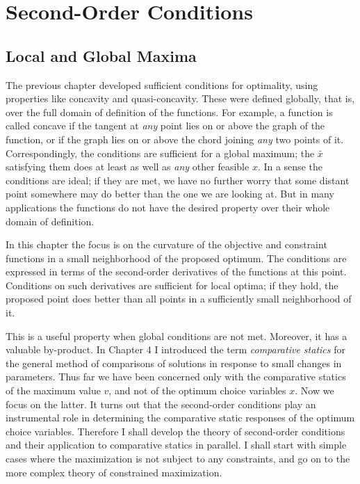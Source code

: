 \chapter{Second-Order Conditions}

\section*{Local and Global Maxima}

The previous chapter developed sufficient conditions for optimality, using properties like concavity and quasi-concavity. These were defined globally, that is, over the full domain of definition of the functions. For example, a function is called concave if the tangent at \textit{any} point lies on or above the graph of the function, or if the graph lies on or above the chord joining \textit{any} two points of it. Correspondingly, the conditions are sufficient for a global maximum; the $\bar{x}$ satisfying them does at least as well as \textit{any} other feasible $x$. In a sense the conditions are ideal; if they are met, we have no further worry that some distant point somewhere may do better than the one we are looking at. But in many applications the functions do not have the desired property over their whole domain of definition.

In this chapter the focus is on the curvature of the objective and constraint functions in a small neighborhood of the proposed optimum. The conditions are expressed in terms of the second-order derivatives of the functions at this point. Conditions on such derivatives are sufficient for local optima; if they hold, the proposed point does better than all points in a sufficiently small neighborhood of it.

This is a useful property when global conditions are not met. Moreover, it has a valuable by-product. In Chapter 4 I introduced the term \textit{comparative statics} for the general method of comparisons of solutions in response to small changes in parameters. Thus far we have been concerned only with the comparative statics of the maximum value $v$, and not of the optimum choice variables $x$. Now we focus on the latter. It turns out that the second-order conditions play an instrumental role in determining the comparative static responses of the optimum choice variables. Therefore I shall develop the theory of second-order conditions and their application to comparative statics in parallel. I shall start with simple cases where the maximization is not subject to any constraints, and go on to the more complex theory of constrained maximization.

